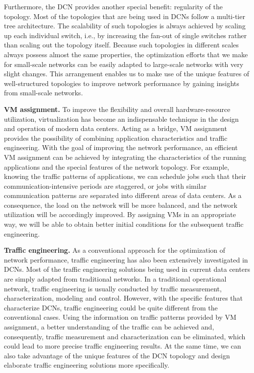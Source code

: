 \documentclass[journal,single-space,two column,twoside,10pt]{IEEEtran}
\begin{document}
Furthermore, the DCN provides another special benefit: regularity of the topology. Most of the topologies that are being used in DCNs follow a multi-tier tree architecture. The scalability of such topologies is always achieved by scaling up each individual switch, i.e., by increasing the fan-out of single switches rather than scaling out the topology itself. Because such topologies in different scales always possess almost the same properties, the optimization efforts that we make for small-scale networks can be easily adapted to large-scale networks with very slight changes. This arrangement enables us to make use of the unique features of well-structured topologies to improve network performance by gaining insights from small-scale networks.

\textbf{VM assignment.} To improve the flexibility and overall hardware-resource utilization, virtualization has become an indispensable technique in the design and operation of modern data centers. 
Acting as a bridge, VM assignment provides the possibility of combining application characteristics and traffic engineering. With the goal of improving the network performance, an efficient VM assignment can be achieved by integrating the characteristics of the running applications and the special features of the network topology. For example, knowing the traffic patterns of applications, we can schedule jobs such that their communication-intensive periods are staggered, or jobs with similar communication patterns are separated into different areas of data centers. As a consequence, the load on the network will be more balanced, and the network utilization will be accordingly improved. By assigning VMs in an appropriate way, we will be able to obtain better initial conditions for the subsequent traffic engineering.

\textbf{Traffic engineering.} As a conventional approach for the optimization of network performance, traffic engineering has also been extensively investigated in DCNs. Most of the traffic engineering solutions being used in current data centers are simply adapted from traditional networks. In a traditional operational network, traffic engineering is usually conducted by traffic measurement, characterization, modeling and control. However, with the specific features that characterize DCNs, traffic engineering could be quite different from the conventional cases. Using the information on traffic patterns provided by VM assignment, a better understanding of the traffic can be achieved and, consequently, traffic measurement and characterization can be eliminated, which could lead to more precise traffic engineering results. At the same time, we can also take advantage of the unique features of the DCN topology and design elaborate traffic engineering solutions more specifically.
\end{document}
